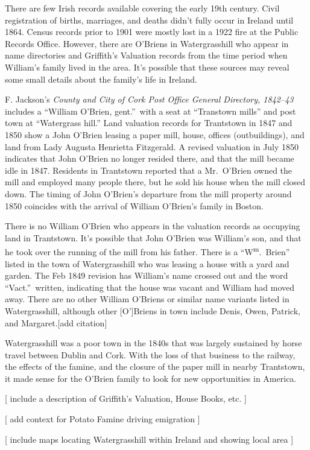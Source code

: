 There are few Irish records available covering the early 19th century. Civil registration of births, marriages, and deaths didn't fully occur in Ireland until 1864.\citep{Grenham1} Census records prior to 1901 were mostly lost in a 1922 fire at the Public Records Office.\citep{Grenham18} However, there are O'Briens in Watergrasshill who appear in name directories and Griffith's Valuation records from the time period when William's family lived in the area. It's possible that these sources may reveal some small details about the family's life in Ireland.

F. Jackson's \textit{County and City of Cork Post Office General Directory, 1842--43} includes a ``William O'Brien, gent.''\ with a seat at ``Transtown mills'' and post town at ``Watergrass hill.''\citep{Jacksons} Land valuation records for Trantstown in 1847 and 1850 show a John O'Brien leasing a paper mill, house, offices (outbuildings), and land from Lady Augusta Henrietta Fitzgerald.\citep{Peramb1847,Peramb1850} A revised valuation in July 1850 indicates that John O'Brien no longer resided there, and that the mill became idle in 1847.\citep{House1850} Residents in Trantstown reported that a Mr.\ O'Brien owned the mill and employed many people there, but he sold his house when the mill closed down.\citep{PaperMill} The timing of John O'Brien's departure from the mill property around 1850 coincides with the arrival of William O'Brien's family in Boston.

There is no William O'Brien who appears in the valuation records as occupying land in Trantstown. It's possible that John O'Brien was William's son, and that he took over the running of the mill from his father. There is a ``W\textsuperscript{m}.\ Brien'' listed in the town of Watergrasshill who was leasing a house with a yard and garden. The Feb 1849 revision has William's name crossed out and the word ``Vact.''\ written, indicating that the house was vacant and William had moved away.\citep{House1849} There are no other William O'Briens or similar name variants listed in Watergrasshill, although other [O']Briens in town include Denis, Owen, Patrick, and Margaret.[add citation]

Watergrasshill was a poor town in the 1840s that was largely sustained by horse travel between Dublin and Cork. With the loss of that business to the railway, the effects of the famine, and the closure of the paper mill in nearby Trantstown, it made sense for the O'Brien family to look for new opportunities in America.



[ include a description of Griffith's Valuation, House Books, etc. ]

[ add context for Potato Famine driving emigration ]

[ include maps locating Watergrasshill within Ireland and showing local area ]


